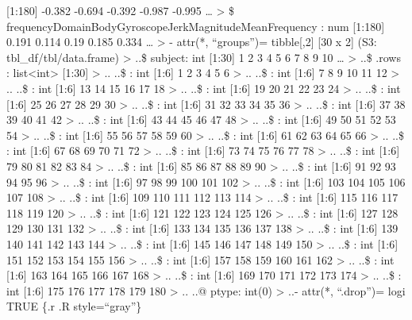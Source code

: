 \documentclass[
]{article}
\begin{document}
{[}1:180{]} -0.382 -0.694 -0.392 -0.987 -0.995 \ldots{} \textgreater{}
\$ frequencyDomainBodyGyroscopeJerkMagnitudeMeanFrequency : num
{[}1:180{]} 0.191 0.114 0.19 0.185 0.334 \ldots{} \textgreater{} -
attr(*, ``groups'')= tibble{[},2{]} {[}30 x 2{]} (S3:
tbl\_df/tbl/data.frame) \textgreater{} ..\$ subject: int {[}1:30{]} 1 2
3 4 5 6 7 8 9 10 \ldots{} \textgreater{} ..\$ .rows :
list\textless int\textgreater{} {[}1:30{]} \textgreater{} .. ..\$ : int
{[}1:6{]} 1 2 3 4 5 6 \textgreater{} .. ..\$ : int {[}1:6{]} 7 8 9 10 11
12 \textgreater{} .. ..\$ : int {[}1:6{]} 13 14 15 16 17 18
\textgreater{} .. ..\$ : int {[}1:6{]} 19 20 21 22 23 24 \textgreater{}
.. ..\$ : int {[}1:6{]} 25 26 27 28 29 30 \textgreater{} .. ..\$ : int
{[}1:6{]} 31 32 33 34 35 36 \textgreater{} .. ..\$ : int {[}1:6{]} 37 38
39 40 41 42 \textgreater{} .. ..\$ : int {[}1:6{]} 43 44 45 46 47 48
\textgreater{} .. ..\$ : int {[}1:6{]} 49 50 51 52 53 54 \textgreater{}
.. ..\$ : int {[}1:6{]} 55 56 57 58 59 60 \textgreater{} .. ..\$ : int
{[}1:6{]} 61 62 63 64 65 66 \textgreater{} .. ..\$ : int {[}1:6{]} 67 68
69 70 71 72 \textgreater{} .. ..\$ : int {[}1:6{]} 73 74 75 76 77 78
\textgreater{} .. ..\$ : int {[}1:6{]} 79 80 81 82 83 84 \textgreater{}
.. ..\$ : int {[}1:6{]} 85 86 87 88 89 90 \textgreater{} .. ..\$ : int
{[}1:6{]} 91 92 93 94 95 96 \textgreater{} .. ..\$ : int {[}1:6{]} 97 98
99 100 101 102 \textgreater{} .. ..\$ : int {[}1:6{]} 103 104 105 106
107 108 \textgreater{} .. ..\$ : int {[}1:6{]} 109 110 111 112 113 114
\textgreater{} .. ..\$ : int {[}1:6{]} 115 116 117 118 119 120
\textgreater{} .. ..\$ : int {[}1:6{]} 121 122 123 124 125 126
\textgreater{} .. ..\$ : int {[}1:6{]} 127 128 129 130 131 132
\textgreater{} .. ..\$ : int {[}1:6{]} 133 134 135 136 137 138
\textgreater{} .. ..\$ : int {[}1:6{]} 139 140 141 142 143 144
\textgreater{} .. ..\$ : int {[}1:6{]} 145 146 147 148 149 150
\textgreater{} .. ..\$ : int {[}1:6{]} 151 152 153 154 155 156
\textgreater{} .. ..\$ : int {[}1:6{]} 157 158 159 160 161 162
\textgreater{} .. ..\$ : int {[}1:6{]} 163 164 165 166 167 168
\textgreater{} .. ..\$ : int {[}1:6{]} 169 170 171 172 173 174
\textgreater{} .. ..\$ : int {[}1:6{]} 175 176 177 178 179 180
\textgreater{} .. ..@ ptype: int(0) \textgreater{} ..- attr(*,
``.drop'')= logi TRUE \{.r .R style=``gray''\}
\end{document}
